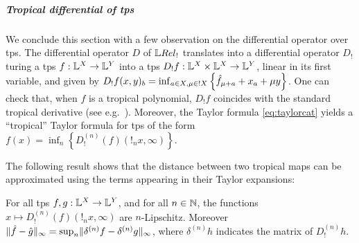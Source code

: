 \subparagraph*{Tropical differential of tps}
We conclude this section with a few observation on the differential operator over tps.
The differential operator $D$ of $\LREL_{!}$ translates into a differential operator $D_{!}$ turing a tps $f:\mathbb{L}^{X}\to \mathbb{L}^{Y}$ into a tps $D_{!}f:\mathbb{L}^{X}\times \mathbb{L}^{X}\to \mathbb{L}^{Y}$, linear in its first variable, and given by 
$D_{!}f(x,y)_{b}=\inf_{a\in X, \mu\in !X}\left\{\hat{f}_{\mu+a}+x_{a}+\mu y\right\}$. One can check that, when $f$ is a tropical polynomial, $D_{!}f$ coincides with the standard tropical derivative (see e.g.~\cite{Grigoriev2017}).
Moreover, the Taylor formula \eqref{eq:taylorcat} yields a ``tropical'' Taylor formula for tps of the form 
$f(x)=\inf_{n}\left\{D_{!}^{(n)}(f)(!_{n}x,\infty)\right\}$. 

The following result shows that the distance between two tropical maps can be approximated using the terms appearing in their Taylor expansions:
\begin{proposition}
For all tps $f,g: \mathbb{L}^{X}\to \mathbb{L}^{Y}$, and for all $n\in \mathbb{N}$, 
the functions $x\mapsto D_{!}^{(n)}(f)(!_{n}x,\infty)$ are $n$-Lipschitz. Moreover 
$\lVert \hat{f}-\hat{g}\rVert_{\infty}= \sup_{n} \lVert {\delta^{(n)}f}- {\delta^{(n)}g}\rVert_{\infty}$, 
where $\delta^{(n)}h$ indicates the matrix of $D_{!}^{(n)}h$.
\end{proposition} 

